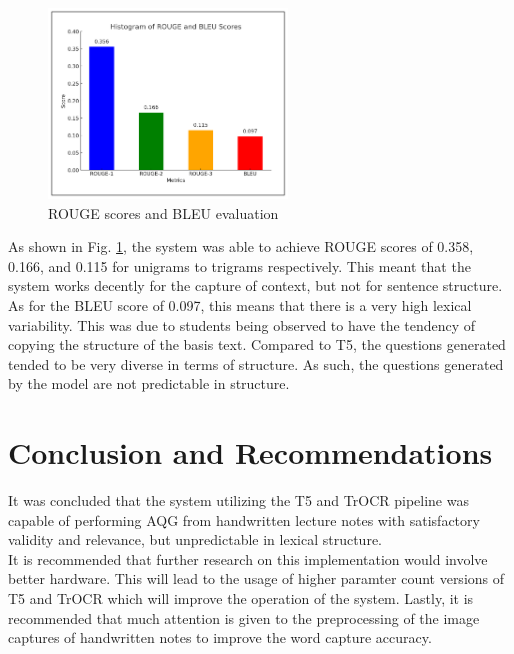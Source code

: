 \documentclass[conference]{IEEEtran}
\begin{document}
    \begin{figure}[H]
        \centerline{\includegraphics[width=2.5in]{eval.png}}
        \vspace{-0.3cm}
        \caption{ROUGE scores and BLEU evaluation} 
        \label{eval}
    \end{figure}

    As shown in Fig. \ref{eval}, the system was able to achieve 
    ROUGE scores of 0.358, 0.166, and 0.115 for unigrams to trigrams 
    respectively. This meant that the system works decently for 
    the capture of context, but not for sentence structure. As for 
    the BLEU score of 0.097, this means that there is a very high 
    lexical variability. This was due to students being observed to 
    have the tendency of copying the structure of the basis text. 
    Compared to T5, the questions generated tended to be 
    very diverse in terms of structure. As such, the questions 
    generated by the model are not predictable in structure. 
\section{Conclusion and Recommendations}
    \indent It was concluded that the system utilizing the T5 and TrOCR 
    pipeline was capable of performing AQG from handwritten lecture notes
    with satisfactory validity and relevance, but unpredictable in 
    lexical structure. \\
    \indent It is recommended that further research on 
    this implementation would involve better hardware. This will lead 
    to the usage of higher paramter count versions of T5 and TrOCR 
    which will improve the operation of the system. Lastly, it is 
    recommended that much attention is given to the preprocessing of 
    the image captures of handwritten notes to improve the word 
    capture accuracy. 




\end{document}
